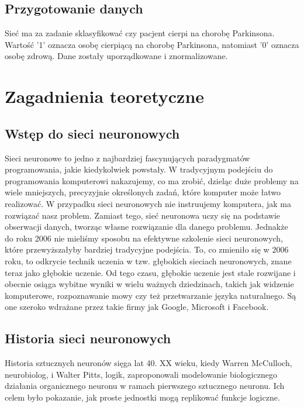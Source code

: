 \documentclass{article}
\begin{document}
\subsection{Przygotowanie danych}
Sieć ma za zadanie sklasyfikować czy pacjent cierpi na chorobę Parkinsona. Wartość '1' oznacza osobę cierpiącą na chorobę Parkinsona, natomiast '0' oznacza osobę zdrową.
Dane zostały uporządkowane i znormalizowane.
\section{Zagadnienia teoretyczne}
\subsection{Wstęp do sieci neuronowych}

Sieci neuronowe to jedno z najbardziej fascynujących paradygmatów programowania, jakie kiedykolwiek powstały.
W tradycyjnym podejściu do programowania komputerowi nakazujemy, co ma zrobić, dzieląc duże problemy na wiele mniejszych, precyzyjnie określonych zadań, które komputer może łatwo realizować.
W przypadku sieci neuronowych nie instruujemy komputera, jak ma rozwiązać nasz problem.
Zamiast tego, sieć neuronowa uczy się na podstawie obserwacji danych, tworząc własne rozwiązanie dla danego problemu.
Jednakże do roku 2006 nie mieliśmy sposobu na efektywne szkolenie sieci neuronowych, które przewyższałyby bardziej tradycyjne podejścia.
To, co zmieniło się w 2006 roku, to odkrycie technik uczenia w tzw. głębokich sieciach neuronowych, znane teraz jako głębokie uczenie.
Od tego czasu, głębokie uczenie jest stale rozwijane i obecnie osiąga wybitne wyniki w wielu ważnych dziedzinach, takich jak widzenie komputerowe, rozpoznawanie mowy czy też przetwarzanie języka naturalnego.
Są one szeroko wdrażane przez takie firmy jak Google, Microsoft i Facebook.
\subsection{Historia sieci neuronowych}


Historia sztucznych neuronów sięga lat 40. XX wieku, kiedy Warren McCulloch, neurobiolog, i Walter Pitts, logik, zaproponowali modelowanie biologicznego działania organicznego neuronu w ramach pierwszego sztucznego neuronu.
Ich celem było pokazanie, jak proste jednostki mogą replikować funkcje logiczne.
\end{document}
